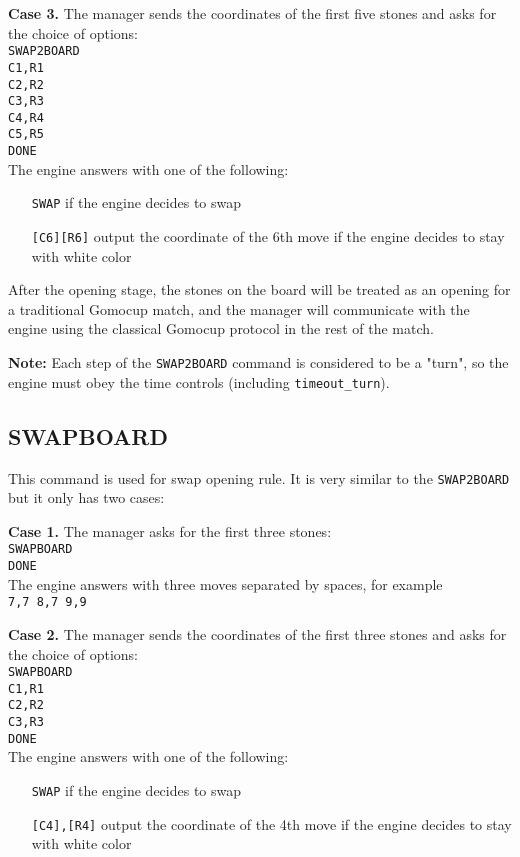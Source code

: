 \documentclass[12pt,a4paper]{article}
\begin{document}
\textbf{Case 3.} The manager sends the coordinates of the first five stones and asks for the choice of options:\\
\texttt{SWAP2BOARD}\\
\texttt{C1,R1}\\
\texttt{C2,R2}\\
\texttt{C3,R3}\\
\texttt{C4,R4}\\
\texttt{C5,R5}\\
\texttt{DONE}\\
The engine answers with one of the following:
\begin{enumerate}[leftmargin=7.5em]
\item[\texttt{SWAP}]{if the engine decides to swap}
\item[\texttt{[C6][R6]}]{output the coordinate of the 6th move if the engine decides to stay with white color}
\end{enumerate}

After the opening stage, the stones on the board will be treated as an opening for a traditional Gomocup match, and the manager will communicate with the engine using the classical Gomocup protocol in the rest of the match.

\textbf{Note:} Each step of the \texttt{SWAP2BOARD} command is considered to be a "turn", so the engine must obey the time controls (including \texttt{timeout{\_}turn}).


\subsection{SWAPBOARD}
\label{cmd_swapboard}
This command is used for swap opening rule. It is very similar to the \texttt{SWAP2BOARD} but it only has two cases:

\textbf{Case 1.} The manager asks for the first three stones:\\
\texttt{SWAPBOARD}\\
\texttt{DONE}\\
The engine answers with three moves separated by spaces, for example\\
\texttt{7,7 8,7 9,9}

\textbf{Case 2.} The manager sends the coordinates of the first three stones and asks for the choice of options:\\
\texttt{SWAPBOARD}\\
\texttt{C1,R1}\\
\texttt{C2,R2}\\
\texttt{C3,R3}\\
\texttt{DONE}\\
The engine answers with one of the following:
\begin{enumerate}[leftmargin=7.5em]
\item[\texttt{SWAP}]{if the engine decides to swap}
\item[\texttt{[C4],[R4]}]{output the coordinate of the 4th move if the engine decides to stay with white color}
\end{enumerate}
\end{document}
